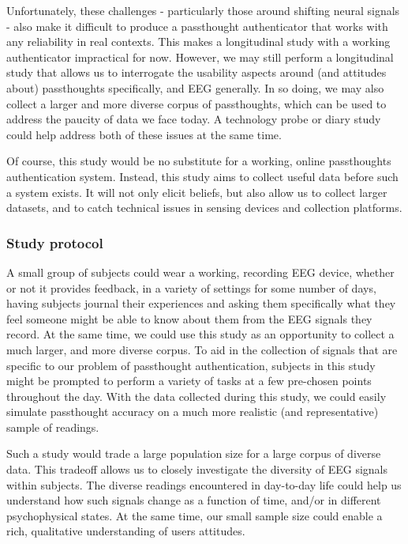 \documentclass[sigconf]{acmart}
\begin{document}
Unfortunately, these challenges - particularly those around shifting neural signals - also make it difficult to produce a passthought authenticator that works with any reliability in real contexts.
This makes a longitudinal study with a working authenticator impractical for now.
However, we may still perform a longitudinal study that allows us to interrogate the usability aspects around (and attitudes about) passthoughts specifically, and EEG generally.
In so doing, we may also collect a larger and more diverse corpus of passthoughts, which can be used to address the paucity of data we face today.
A technology probe or diary study \cite{Gaver1999} could help address both of these issues at the same time.

Of course, this study would be no substitute for a working, online passthoughts authentication system.
Instead, this study aims to collect useful data before such a system exists.
It will not only elicit beliefs, 
but also allow us to collect larger datasets, 
and to catch technical issues in sensing devices and collection platforms.

\subsubsection{Study protocol}
\label{sec:org0ed08a7}
A small group of subjects could wear a working, recording EEG device, whether or not it provides feedback, in a variety of settings for some number of days,
having subjects journal their experiences and asking them specifically what they feel someone might be able to know about them from the EEG signals they record.
At the same time, we could use this study as an opportunity to collect a much larger, and more diverse corpus.
To aid in the collection of signals that are specific to our problem of passthought authentication,
subjects in this study might be prompted to perform a variety of tasks at a few pre-chosen points throughout the day.
With the data collected during this study, we could easily simulate passthought accuracy on a much more realistic (and representative) sample of readings.

Such a study would trade a large population size for a large corpus of diverse data.
This tradeoff allows us to closely investigate the diversity of EEG signals within subjects.
The diverse readings encountered in day-to-day life could help us understand how such signals change as a function of time, and/or in different psychophysical states.
At the same time, our small sample size could enable a rich, qualitative understanding of users attitudes.
\end{document}
